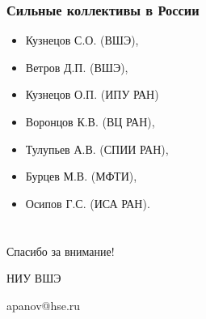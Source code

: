\documentclass[default]{beamer}
\begin{document}
	\begin{frame}
		\frametitle{Сильные коллективы в России}
		
		\begin{itemize}
			\item Кузнецов С.О. (ВШЭ),
			\item Ветров Д.П. (ВШЭ),
			\item Кузнецов О.П. (ИПУ РАН)
			\item Воронцов К.В. (ВЦ РАН),
			\item Тулупьев А.В. (СПИИ РАН),
			\item Бурцев М.В. (МФТИ),
			\item Осипов Г.С. (ИСА РАН).
		\end{itemize}
	\end{frame}
	\section*{}
	{
	\begin{frame}
		\centering
		\Huge
		Спасибо за внимание!
		\normalsize
		\par\bigskip
		\par\bigskip
		НИУ ВШЭ
		
		\par\bigskip
		apanov@hse.ru
	\end{frame}			
	}
\end{document}
